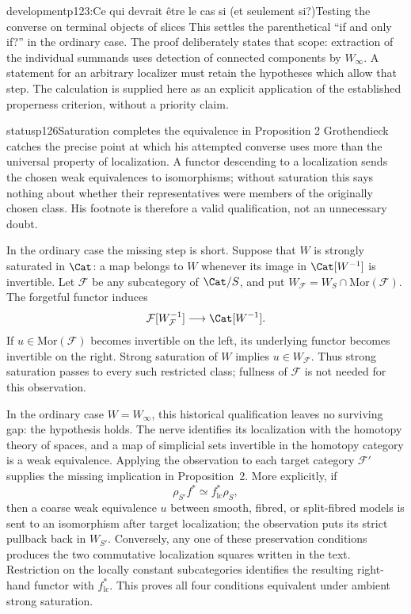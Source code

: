 \begin{dcomment}{development}{p123:Ce qui devrait être le cas si (et seulement si?)}{Testing the converse on terminal objects of slices}
This settles the parenthetical ``if and only if?'' in the ordinary case. The proof deliberately states that scope: extraction of the individual summands uses detection of connected components by $W_\infty$. A statement for an arbitrary localizer must retain the hypotheses which allow that step. The calculation is supplied here as an explicit application of the established properness criterion, without a priority claim.
\end{dcomment}

\begin{dcomment}{status}{p126}{Saturation completes the equivalence in Proposition 2}
Grothendieck catches the precise point at which his attempted converse uses more than the universal property of localization. A functor descending to a localization sends the chosen weak equivalences to isomorphisms; without saturation this says nothing about whether their representatives were members of the originally chosen class. His footnote is therefore a valid qualification, not an unnecessary doubt.

In the ordinary case the missing step is short. Suppose that $W$ is strongly saturated in $\Cat$: a map belongs to $W$ whenever its image in $\Cat[W^{-1}]$ is invertible. Let $\mathcal F$ be any subcategory of $\Cat/S$, and put $W_{\mathcal F}=W_S\cap\mathrm{Mor}(\mathcal F)$. The forgetful functor induces
\[
 \mathcal F[W_{\mathcal F}^{-1}]\longrightarrow\Cat[W^{-1}].
\]
If $u\in\mathrm{Mor}(\mathcal F)$ becomes invertible on the left, its underlying functor becomes invertible on the right. Strong saturation of $W$ implies $u\in W_{\mathcal F}$. Thus strong saturation passes to every such restricted class; fullness of $\mathcal F$ is not needed for this observation.

In the ordinary case $W=W_\infty$, this historical qualification leaves no surviving gap: the hypothesis holds. The nerve identifies its localization with the homotopy theory of spaces, and a map of simplicial sets invertible in the homotopy category is a weak equivalence. Applying the observation to each target category $\mathcal F'$ supplies the missing implication in Proposition~2. More explicitly, if
\[
 \rho_{S'}f^*\simeq f^*_{\mathrm{lc}}\rho_S,
\]
then a coarse weak equivalence $u$ between smooth, fibred, or split-fibred models is sent to an isomorphism after target localization; the observation puts its strict pullback back in $W_{S'}$. Conversely, any one of these preservation conditions produces the two commutative localization squares written in the text. Restriction on the locally constant subcategories identifies the resulting right-hand functor with $f^*_{\mathrm{lc}}$. This proves all four conditions equivalent under ambient strong saturation.


\end{dcomment}
